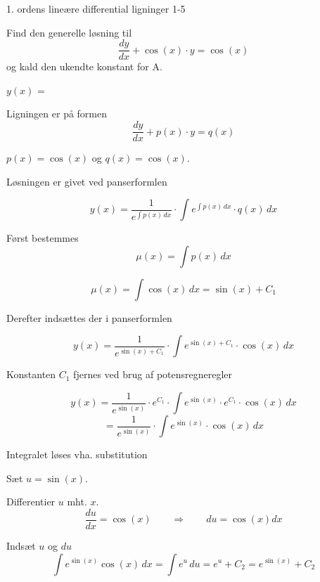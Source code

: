 \documentclass{article}
\begin{document}
\newpage

\begin{exercise}{1. ordens lineære differential ligninger 1-5}
	
	
	
	
	
	Find den generelle løsning til
	\[
	\frac{dy}{dx} + \cos(x) \cdot y = \cos(x)
	\]
	og kald den ukendte konstant for A.
	
	$y(x)$ =  
	
	
	
	\hint
	
	Ligningen er på formen
	\[
	\frac{dy}{dx} + p(x) \cdot y = q(x)
	\]
	
	\hint
	
	$p(x)=\cos(x)$ og $q(x)=\cos(x)$.
	
	\hint
	
	Løsningen er givet ved panserformlen
	
	
	\hint
	
	\[
	y(x) = \frac{1}{e^{\int p(x) \, dx}} \cdot \int e^{\int p(x) \, dx}  \cdot q(x) \, dx
	\]
	
	\hint
	
	Først bestemmes 
	\[
	\mu(x) = \int p(x) \, dx
	\]
	
	\hint
	\[
	\mu(x) = \int \cos(x) \, dx = \sin(x) + C_1
	\]
	
	\hint
	Derefter indsættes der i  panserformlen
	
	\hint
	
	\[
	y(x) = \frac{1}{e^{\sin(x) + C_1}} \cdot \int e^{\sin(x) + C_1}  \cdot \cos(x) \, dx
	\]
	
	
	\hint
	
	Konstanten $C_1$ fjernes ved brug af potensregneregler
	
	\hint
	\[
	y(x) = \frac{1}{e^{\sin(x)}} \cdot e^{C_1} \cdot \int e^{\sin(x)} \cdot e^{C_1}  \cdot \cos(x) \, dx 
	\]
	\[
	= \frac{1}{e^{\sin(x)}} \cdot \int e^{\sin(x)}  \cdot \cos(x) \, dx
	\]
	
	\hint
	
	Integralet løses vha. substitution
	
	
	\hint
	Sæt $u = \sin(x)$.
	
	\hint
	
	Differentier $u$ mht. $x$.
	\[
	\frac{du}{dx} = \cos(x) \qquad	\Rightarrow \qquad du = \cos(x) dx
	\]
	
	\hint 
	Indsæt $u$ og $du$
	\[
	\int e^{\sin(x)} \cos(x) \, dx = \int e^{u} \, du = e^{u} + C_2 = e^{\sin(x)} + C_2
	\]
	

\end{exercise}
\end{document}

